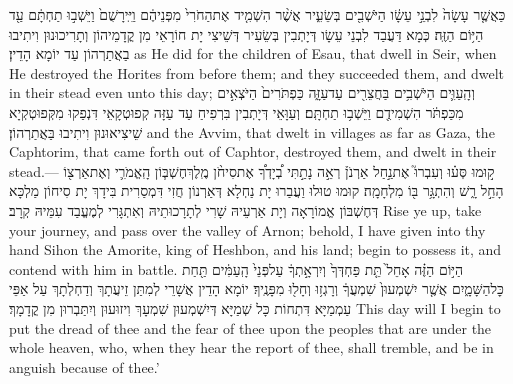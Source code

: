{כַּאֲשֶׁ֤ר עָשָׂה֙ לִבְנֵ֣י עֵשָׂ֔ו הַיֹּשְׁבִ֖ים בְּשֵׂעִ֑יר אֲשֶׁ֨ר הִשְׁמִ֤יד אֶת\maqqaf הַחֹרִי֙ מִפְּנֵיהֶ֔ם וַיִּֽירָשֻׁם֙ וַיֵּשְׁב֣וּ תַחְתָּ֔ם עַ֖ד הַיּ֥וֹם הַזֶּֽה׃}
{כְּמָא דַּעֲבַד לִבְנֵי עֵשָׂו דְּיָתְבִין בְּשֵׂעִיר דְּשֵׁיצִי יָת חוֹרָאֵי מִן קֳדָמֵיהוֹן וְתָרִיכוּנוּן וִיתִיבוּ בַאֲתַרְהוֹן עַד יוֹמָא הָדֵין׃}
{as He did for the children of Esau, that dwell in Seir, when He destroyed the Horites from before them; and they succeeded them, and dwelt in their stead even unto this day;}{}
{וְהָֽעַוִּ֛ים הַיֹּשְׁבִ֥ים בַּחֲצֵרִ֖ים עַד\maqqaf עַזָּ֑ה כַּפְתֹּרִים֙ הַיֹּצְאִ֣ים מִכַּפְתֹּ֔ר הִשְׁמִידֻ֖ם וַיֵּשְׁב֥וּ תַחְתָּֽם׃}
{וְעַוָּאֵי דְּיָתְבִין בִּרְפִיחַ עַד עַזָּה קְפוּטְקָאֵי דִּנְפַקוּ מִקְּפוּטְקְיָא שֵׁיצִיאוּנוּן וִיתִיבוּ בַּאֲתַרְהוֹן׃}
{and the Avvim, that dwelt in villages as far as Gaza, the Caphtorim, that came forth out of Caphtor, destroyed them, and dwelt in their stead.—}{}
{ק֣וּמוּ סְּע֗וּ וְעִבְרוּ֮ אֶת\maqqaf נַ֣חַל אַרְנֹן֒ רְאֵ֣ה נָתַ֣תִּי בְ֠יָדְךָ֠ אֶת\maqqaf סִיחֹ֨ן מֶֽלֶךְ\maqqaf חֶשְׁבּ֧וֹן הָֽאֱמֹרִ֛י וְאֶת\maqqaf אַרְצ֖וֹ הָחֵ֣ל רָ֑שׁ וְהִתְגָּ֥ר בּ֖וֹ מִלְחָמָֽה׃}
{קוּמוּ טוּלוּ וַעֲבַרוּ יָת נַחְלָא דְּאַרְנוֹן חֲזִי דִּמְסַרִית בִּידָךְ יָת סִיחוֹן מַלְכָּא דְּחֶשְׁבּוֹן אֱמוֹרָאָה וְיָת אַרְעֵיהּ שָׁרִי לְתָרָכוּתֵיהּ וְאִתְגָּרִי לְמֶעֱבַד עִמֵּיהּ קְרָב׃}
{Rise ye up, take your journey, and pass over the valley of Arnon; behold, I have given into thy hand Sihon the Amorite, king of Heshbon, and his land; begin to possess it, and contend with him in battle.}{}
{הַיּ֣וֹם הַזֶּ֗ה אָחֵל֙ תֵּ֤ת פַּחְדְּךָ֙ וְיִרְאָ֣תְךָ֔ עַל\maqqaf פְּנֵי֙ הָֽעַמִּ֔ים תַּ֖חַת כׇּל\maqqaf הַשָּׁמָ֑יִם אֲשֶׁ֤ר יִשְׁמְעוּן֙ שִׁמְעֲךָ֔ וְרָגְז֥וּ וְחָל֖וּ מִפָּנֶֽיךָ׃}
{יוֹמָא הָדֵין אֲשָׁרֵי לְמִתַּן זֵיעֲתָךְ וְדַחְלְתָךְ עַל אַפֵּי עַמְמַיָּא דִּתְחוֹת כָּל שְׁמַיָּא דְּיִשְׁמְעוּן שִׁמְעָךְ וִיזוּעוּן וְיִתַּבְרוּן מִן קֳדָמָךְ׃}
{This day will I begin to put the dread of thee and the fear of thee upon the peoples that are under the whole heaven, who, when they hear the report of thee, shall tremble, and be in anguish because of thee.’}{}
